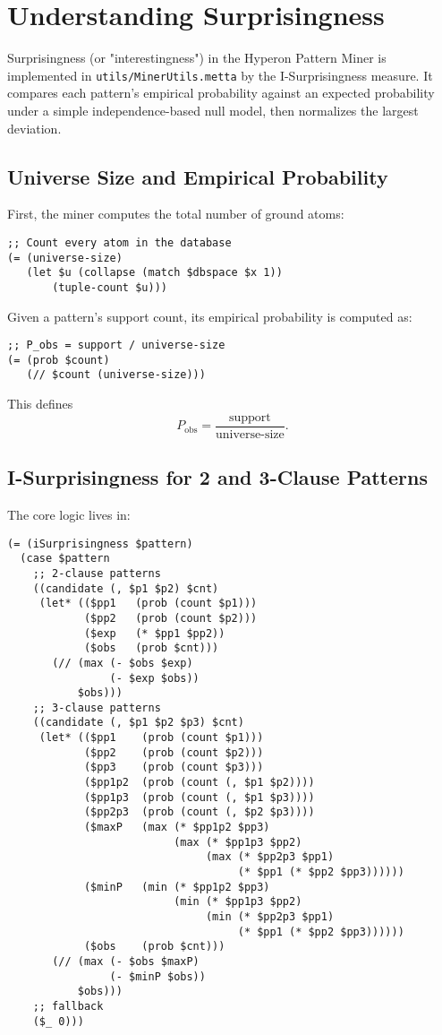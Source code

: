 \section{Understanding Surprisingness}

Surprisingness (or "interestingness") in the Hyperon Pattern Miner is implemented in \texttt{utils/MinerUtils.metta} by the I-Surprisingness measure. It compares each pattern's empirical probability against an expected probability under a simple independence-based null model, then normalizes the largest deviation.

\subsection{Universe Size and Empirical Probability}

First, the miner computes the total number of ground atoms:

\begin{verbatim}
;; Count every atom in the database
(= (universe-size)
   (let $u (collapse (match $dbspace $x 1))
       (tuple-count $u)))
\end{verbatim}

Given a pattern's support count, its empirical probability is computed as:

\begin{verbatim}
;; P_obs = support / universe-size
(= (prob $count)
   (// $count (universe-size)))
\end{verbatim}

This defines
\[
  P_{\mathrm{obs}}
  = \frac{\mathrm{support}}{\text{universe-size}}.
\]
\subsection{I-Surprisingness for 2 and 3-Clause Patterns}

The core logic lives in:

\begin{verbatim}
(= (iSurprisingness $pattern)
  (case $pattern
    ;; 2-clause patterns
    ((candidate (, $p1 $p2) $cnt)
     (let* (($pp1   (prob (count $p1)))
            ($pp2   (prob (count $p2)))
            ($exp   (* $pp1 $pp2))
            ($obs   (prob $cnt)))
       (// (max (- $obs $exp)
                (- $exp $obs))
           $obs)))
    ;; 3-clause patterns
    ((candidate (, $p1 $p2 $p3) $cnt)
     (let* (($pp1    (prob (count $p1)))
            ($pp2    (prob (count $p2)))
            ($pp3    (prob (count $p3)))
            ($pp1p2  (prob (count (, $p1 $p2))))
            ($pp1p3  (prob (count (, $p1 $p3))))
            ($pp2p3  (prob (count (, $p2 $p3))))
            ($maxP   (max (* $pp1p2 $pp3)
                          (max (* $pp1p3 $pp2)
                               (max (* $pp2p3 $pp1)
                                    (* $pp1 (* $pp2 $pp3))))))
            ($minP   (min (* $pp1p2 $pp3)
                          (min (* $pp1p3 $pp2)
                               (min (* $pp2p3 $pp1)
                                    (* $pp1 (* $pp2 $pp3))))))
            ($obs    (prob $cnt)))
       (// (max (- $obs $maxP)
                (- $minP $obs))
           $obs)))
    ;; fallback
    ($_ 0)))
\end{verbatim}


